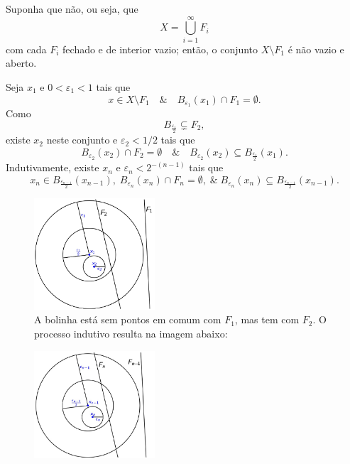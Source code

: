 \documentclass[../functional_analysis.tex]{subfiles}
\begin{document}
\begin{proof*}
	Suponha que não, ou seja, que
	\[
		X = \bigcup_{i=1}^{\infty}F_{i}
	\]
	com cada \(F_{i}\) fechado e de interior vazio; então, o conjunto \(X\setminus{F_1}\) é não vazio e aberto.

	Seja \(x_1\) e \(0 < \varepsilon_1 < 1\) tais que
	\[
		x\in X\setminus{F_1}\quad\&\quad B_{\varepsilon_1}(x_1)\cap F_1 = \emptyset .
	\]
	Como
	\[
		B_{\frac{\varepsilon_1 }{2}}\subsetneq F_2,
	\]
	existe \(x_2\) neste conjunto e \(\varepsilon_2 < 1/2\) tais que
	\[
		B_{\varepsilon_2}(x_2)\cap F_2 = \emptyset \quad\&\quad B_{\varepsilon_2}(x_2)\subseteq B_{\frac{\varepsilon_1}{2}}(x_1).
	\]
	Indutivamente, existe \(x_{n}\) e \(\varepsilon_{n} < 2^{-(n-1)}\) tais que
	\[
		x_{n}\in B_{\frac{\varepsilon_{n-1}}{2}}(x_{n-1}),\; B_{\varepsilon_{n}}(x_{n})\cap F_{n} = \emptyset ,\;\&\; B_{\varepsilon_{n}}(x_{n})\subseteq B_{\frac{\varepsilon_{n-1}}{2}}(x_{n-1}).
	\]
	\begin{figure}[H]
		\begin{center}
			\includegraphics[height=0.4\textheight, width=0.4\textwidth, keepaspectratio]{./Images/b2_10.png}
		\end{center}
		\caption{A bolinha está sem pontos em comum com \(F_1\), mas tem com \(F_2\). O processo indutivo resulta na imagem abaixo:}
	\end{figure}
	\begin{figure}[H]
		\begin{center}
			\includegraphics[height=0.4\textheight, width=0.4\textwidth, keepaspectratio]{./Images/bn_10.png}
		\end{center}
	\end{figure}


\end{proof*}
\end{document}
